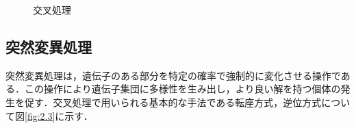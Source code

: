 \newpage

\begin{figure}[p]
\begin{center}





\caption{交叉処理}
\label{tb:cross}


\end{center}

\end{figure}



\clearpage



\subsection{突然変異処理}
\label{sec2.1.5}

突然変異処理は，遺伝子のある部分を特定の確率で強制的に変化させる操作である．この操作により遺伝子集団に多様性を生み出し，より良い解を持つ個体の発生を促す．交叉処理で用いられる基本的な手法である転座方式，逆位方式について図\ref{fig:2.3}に示す．

